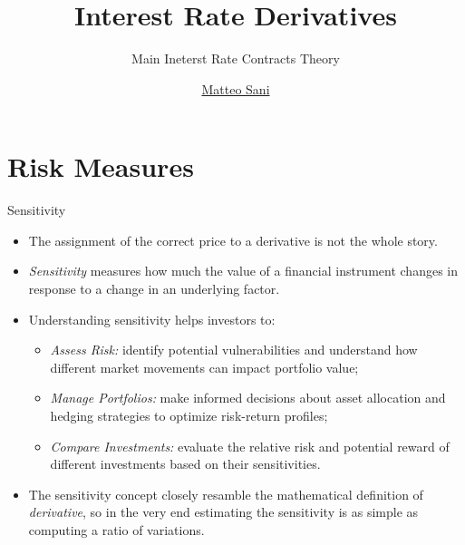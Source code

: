 \documentclass{beamer}
\title{Interest Rate Derivatives}
\subtitle{Main Ineterst Rate Contracts Theory}
\author{\href{mailto:matteo.sani@unisi.it}{Matteo Sani}}
\begin{document}
\begin{frame}[plain]
  \maketitle
\end{frame}


\section{Risk Measures}
\begin{frame}{Sensitivity}
\begin{itemize}
\item The assignment of the correct price to a derivative is not the whole story.
\item \emph{Sensitivity} measures how much the value of a financial instrument changes in response to a change in an underlying factor.  
\item Understanding sensitivity helps investors to:
\begin{itemize}
    \item \emph{Assess Risk:} identify potential vulnerabilities and understand how different market movements can impact portfolio value;
    \item \emph{Manage Portfolios:} make informed decisions about asset allocation and hedging strategies to optimize risk-return profiles;
    \item \emph{Compare Investments:} evaluate the relative risk and potential reward of different investments based on their sensitivities.
\end{itemize}
\item The sensitivity concept closely resamble the mathematical definition of \emph{derivative}, so in the very end estimating the sensitivity is as simple as computing a ratio of variations.
\end{itemize}
\end{frame}
\end{document}
